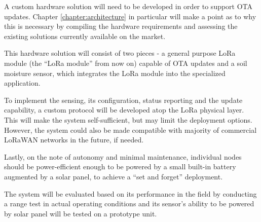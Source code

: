 A custom hardware solution will need to be developed in order to support OTA updates. Chapter \ref{chapter:architecture} in particular will make a point as to why this is necessary by compiling the hardware requirements and assessing the existing solutions currently available on the market. 

This hardware solution will consist of two pieces - a general purpose LoRa module (the ``LoRa module'' from now on) capable of OTA updates and a soil moisture sensor, which integrates the LoRa module into the specialized application.

To implement the sensing, its configuration, status reporting and the update capability, a custom protocol will be developed atop the LoRa physical layer. This will make the system self-sufficient, but may limit the deployment options. However, the system could also be made compatible with majority of commercial LoRaWAN networks in the future, if needed.

Lastly, on the note of autonomy and minimal maintenance, individual nodes should be power-efficient enough to be powered by a small built-in battery augmented by a solar panel, to achieve a ``set and forget'' deployment. 

The system will be evaluated based on its performance in the field by conducting a range test in actual operating conditions and its sensor's ability to be powered by solar panel will be tested on a prototype unit.
